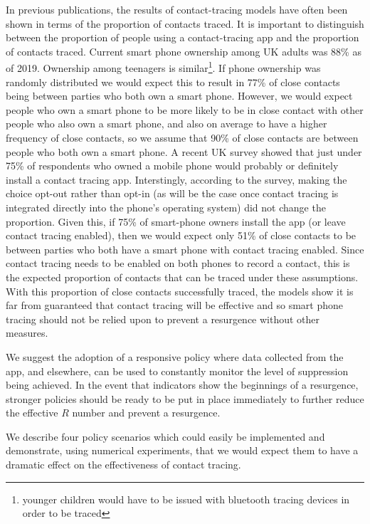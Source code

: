 \documentclass{article}
\begin{document}
In previous publications, the results of contact-tracing models have often been shown in terms of the proportion of contacts traced. It is important to distinguish between the proportion of people using a contact-tracing app and the proportion of contacts traced. Current smart phone ownership among UK adults was 88\% as of 2019\cite{deloitte}. Ownership among teenagers is similar\cite{statistica}\footnote{younger children would have to be issued with bluetooth tracing devices in order to be traced}. If phone ownership was randomly distributed we would expect this to result in 77\% of close contacts being between parties who both own a smart phone. However, we would expect people who own a smart phone to be more likely to be in close contact with other people who also own a smart phone, and also on average to have a higher frequency of close contacts, so we assume that 90\% of close contacts are between people who both own a smart phone. A recent UK survey\cite{abeler2020Support} showed that just under 75\% of respondents who owned a mobile phone would probably or definitely install a contact tracing app. Interstingly, according to the survey, making the choice opt-out rather than opt-in (as will be the case once contact tracing is integrated directly into the phone's operating system) did not change the proportion. Given this, if 75\% of smart-phone owners install the app (or leave contact tracing enabled), then we would expect only 51\% of close contacts to be between parties who both have a smart phone with contact tracing enabled. Since contact tracing needs to be enabled on both phones to record a contact, this is the expected proportion of contacts that can be traced under these assumptions. With this proportion of close contacts successfully traced, the models show it is far from guaranteed that contact tracing will be effective and so smart phone tracing should not be relied upon to prevent a resurgence without other measures.

We suggest the adoption of a responsive policy where data collected from the app, and elsewhere, can be used to constantly monitor the level of suppression being achieved. In the event that indicators show the beginnings of a resurgence, stronger policies should be ready to be put in place immediately to further reduce the effective $R$ number and prevent a resurgence.

We describe four policy scenarios which could easily be implemented and demonstrate, using numerical experiments, that we would expect them to have a dramatic effect on the effectiveness of contact tracing.
\end{document}
